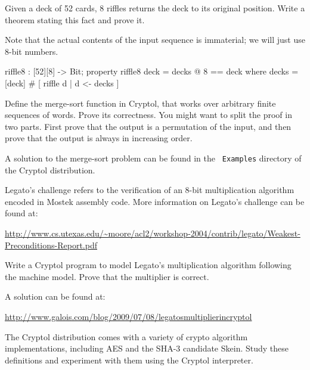 \begin{Exercise}\label{ex:misc:riffle2}
  Given a deck of 52 cards, 8 riffles returns the deck to its original
  position. Write a theorem stating this fact and prove it.
\end{Exercise}
\begin{Answer}
  Note that the actual contents of the input sequence is immaterial;
  we will just use 8-bit numbers.
\begin{code}
   riffle8 : [52][8] -> Bit;
   property riffle8 deck = decks @ 8 == deck
     where decks = [deck] # [ riffle d | d <- decks ]
\end{code}
\end{Answer}

\begin{Exercise}\label{ex:misc:sort}
  Define the merge-sort function in Cryptol, that works over arbitrary
  finite sequences of words. Prove its correctness. You might want to
  split the proof in two parts. First prove that the output is a
  permutation of the input, and then prove that the output is always
  in increasing order.
\end{Exercise}
\begin{Answer}
  A solution to the merge-sort problem can be found in the {\tt
    Examples} directory of the Cryptol distribution.
\end{Answer}

\begin{Exercise}\label{ex:misc:legato}
  Legato's challenge refers to the verification of an 8-bit
  multiplication algorithm encoded in Mostek assembly code. More
  information on Legato's challenge can be found at:
\begin{center}
 \url{http://www.cs.utexas.edu/~moore/acl2/workshop-2004/contrib/legato/Weakest-Preconditions-Report.pdf}
\end{center}
Write a Cryptol program to model Legato's multiplication algorithm
following the machine model. Prove that the multiplier is correct.
\end{Exercise}
\begin{Answer}
A solution can be found at:
\begin{center} \url{http://www.galois.com/blog/2009/07/08/legatosmultiplierincryptol}
\end{center}
\end{Answer}

\begin{Exercise}\label{ex:misc:skein}
  The Cryptol distribution comes with a variety of crypto algorithm
  implementations, including AES and the SHA-3 candidate Skein.  Study
  these definitions and experiment with them using the Cryptol
  interpreter.
\end{Exercise}
